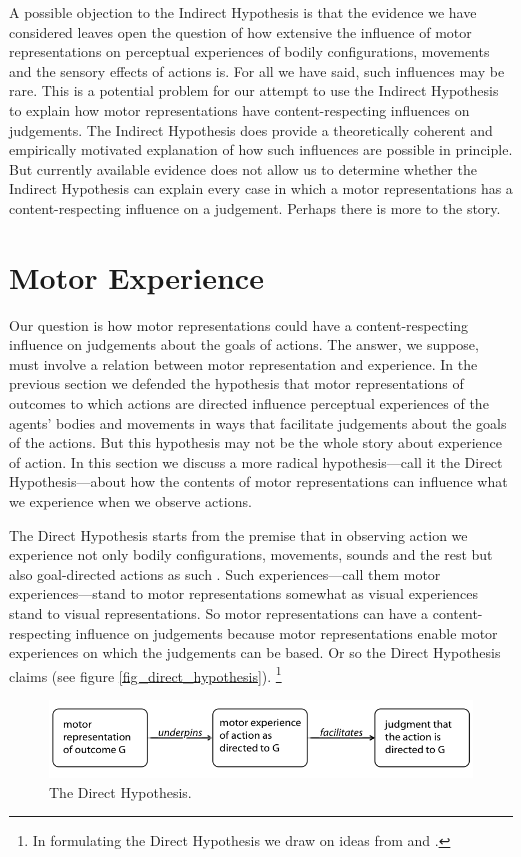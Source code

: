\documentclass[12pt,\papersize]{extarticle}
\begin{document}
A possible objection to the Indirect Hypothesis is that the evidence we have considered leaves open the question of how extensive the influence of motor representations on perceptual experiences of bodily configurations, movements and the sensory effects of actions is.  For all we have said, such influences may be rare.  This is a potential problem for our attempt to use the Indirect Hypothesis to explain how motor representations have content-respecting influences on judgements.  The Indirect Hypothesis does provide a theoretically coherent and empirically motivated explanation of how such influences are possible in principle. But currently available evidence does not allow us to determine whether the Indirect Hypothesis can explain every case in which a motor representations has a content-respecting influence on a judgement.  Perhaps there is more to the story.

\section{Motor Experience}
Our question is how motor representations could have a content-respecting influence on judgements about the goals of actions.
The answer, we suppose, must involve a relation between motor representation and experience.
In the previous section we defended the hypothesis that motor representations of outcomes to which actions are directed influence perceptual experiences of the agents' bodies and movements in ways that facilitate judgements about the goals of the actions. 
But this hypothesis may not be the whole story about experience of action.
In this section we discuss a more radical hypothesis---call it the Direct Hypothesis---about how the contents of motor representations can influence what we experience when we observe actions. 

The Direct Hypothesis starts from the premise that in observing action we experience not only bodily configurations, movements, sounds and the rest but also goal-directed actions as such . Such experiences---call them motor experiences---stand to motor representations somewhat as visual experiences stand to visual representations.  So motor representations can have a content-respecting influence on judgements because motor representations enable motor experiences on which the judgements can be  based.  Or so the Direct Hypothesis claims 
(see figure \vref{fig_direct_hypothesis}).%
\footnote{
In formulating the Direct Hypothesis we draw on ideas from \citet{rizzolatti_mirrors_2008} and \citet{Jeannerod:1999kj}.
}

\begin{figure}
\begin{center}
\includegraphics[width=\textwidth]{fig_direct_hypothesis.png}
\caption{
\label{fig_direct_hypothesis}
	The Direct Hypothesis.
}
\end{center}
\end{figure}


 


\end{document}
